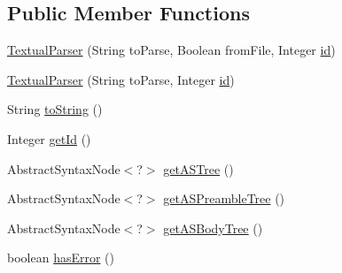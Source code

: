 \subsection*{Public Member Functions}
\begin{DoxyCompactItemize}
\item 
\hyperlink{classit_1_1emarolab_1_1cagg_1_1core_1_1language_1_1parser_1_1TextualParser_a21c889dd346843225cc6e9034ae0005c}{Textual\-Parser} (String to\-Parse, Boolean from\-File, Integer \hyperlink{classit_1_1emarolab_1_1cagg_1_1core_1_1language_1_1parser_1_1TextualParser_ad55874c03b0539971ad34a18727399ff}{id})
\item 
\hyperlink{classit_1_1emarolab_1_1cagg_1_1core_1_1language_1_1parser_1_1TextualParser_a4635df475bf70bb164ed66352ec9cc6d}{Textual\-Parser} (String to\-Parse, Integer \hyperlink{classit_1_1emarolab_1_1cagg_1_1core_1_1language_1_1parser_1_1TextualParser_ad55874c03b0539971ad34a18727399ff}{id})
\item 
String \hyperlink{classit_1_1emarolab_1_1cagg_1_1core_1_1language_1_1parser_1_1TextualParser_a6c77fb3326546964bd2b53d508b2edc7}{to\-String} ()
\item 
Integer \hyperlink{classit_1_1emarolab_1_1cagg_1_1core_1_1language_1_1parser_1_1TextualParser_a7af90ab2e8fcfe667b6d4c7193351b70}{get\-Id} ()
\item 
Abstract\-Syntax\-Node$<$?$>$ \hyperlink{classit_1_1emarolab_1_1cagg_1_1core_1_1language_1_1parser_1_1TextualParser_adc8b9870bcc1c8637375312e8c73eb76}{get\-A\-S\-Tree} ()
\item 
Abstract\-Syntax\-Node$<$?$>$ \hyperlink{classit_1_1emarolab_1_1cagg_1_1core_1_1language_1_1parser_1_1TextualParser_a01993ec03cc1574528434213fad5916d}{get\-A\-S\-Preamble\-Tree} ()
\item 
Abstract\-Syntax\-Node$<$?$>$ \hyperlink{classit_1_1emarolab_1_1cagg_1_1core_1_1language_1_1parser_1_1TextualParser_a0efa52766f64a4dbe1caca72bdd6782e}{get\-A\-S\-Body\-Tree} ()
\item 
boolean \hyperlink{classit_1_1emarolab_1_1cagg_1_1core_1_1language_1_1parser_1_1TextualParser_a383056b22669f4ccc056ba2f9c5b2769}{has\-Error} ()
\end{DoxyCompactItemize}
